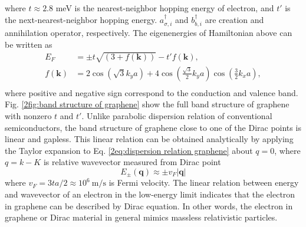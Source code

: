      where $t \approx 2.8$ meV is the nearest-neighbor hopping energy of electron, and $t'$ is the next-nearest-neighbor hopping energy.
     $a_{\sigma, i}^{\dagger}$ and $b_{b,i}^{\dagger}$ are creation and annihilation operator, respectively.
     The eigenenergies of Hamiltonian above can be written as
     \begin{equation} \label{2eq:dispersion relation graphene}
        \begin{aligned}
            E_F &= \pm t\sqrt{(3+f(\boldsymbol{k} ))} - t' f(\boldsymbol{k}),\\
            f({\boldsymbol{k}}) &= 2 \cos{(\sqrt{3} k_y a)}+ 4 \cos{\left(\frac{\sqrt{3}}{2} k_y a\right)} \cos{\left(\frac{3}{2} k_x a\right)},\\
        \end{aligned}
     \end{equation}
    where positive and negative sign correspond to the conduction and valence band.
    Fig. \ref{2fig:band structure of graphene} show the full band structure of graphene with nonzero $t$ and $t'$.
    Unlike parabolic dispersion relation of conventional semiconductors, the band structure of graphene close to one of the Dirac points is linear and gapless.
    This linear relation can be obtained analytically by applying the Taylor expansion to Eq. \ref{2eq:dispersion relation graphene} about $q = 0$, 
    where $q = k-K$ is relative wavevector measured from Dirac point
    \begin{equation} \label{2eq:approx energy dispersion}
        E_{\pm}(\boldsymbol{q})\approx \pm v_F |\boldsymbol{q}|        
    \end{equation}
    where $v_F = 3ta/2 \approx 10^6\ \mathrm{m/s}$  is Fermi velocity. 
    The linear relation between energy and wavevector of an electron in the low-energy limit indicates that the electron in graphene can be described by Dirac equation.
    In other words, the electron in graphene or Dirac material in general mimics massless relativistic particles.
